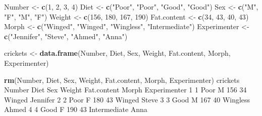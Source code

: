 \documentclass[
]{book}
\newenvironment{Shaded}{\begin{snugshade}}{\end{snugshade}}
\newcommand{\DecValTok}[1]{\textcolor[rgb]{0.00,0.00,0.81}{#1}}
\newcommand{\KeywordTok}[1]{\textcolor[rgb]{0.13,0.29,0.53}{\textbf{#1}}}
\newcommand{\NormalTok}[1]{#1}
\newcommand{\StringTok}[1]{\textcolor[rgb]{0.31,0.60,0.02}{#1}}
\begin{document}
\begin{Shaded}
\begin{Highlighting}[]
\NormalTok{Number <-}\StringTok{ }\KeywordTok{c}\NormalTok{(}\DecValTok{1}\NormalTok{, }\DecValTok{2}\NormalTok{, }\DecValTok{3}\NormalTok{, }\DecValTok{4}\NormalTok{)}
\NormalTok{Diet <-}\StringTok{ }\KeywordTok{c}\NormalTok{(}\StringTok{"Poor"}\NormalTok{, }\StringTok{"Poor"}\NormalTok{, }\StringTok{"Good"}\NormalTok{, }\StringTok{"Good"}\NormalTok{)}
\NormalTok{Sex <-}\StringTok{ }\KeywordTok{c}\NormalTok{(}\StringTok{"M"}\NormalTok{, }\StringTok{"F"}\NormalTok{, }\StringTok{"M"}\NormalTok{, }\StringTok{"F"}\NormalTok{) }
\NormalTok{Weight <-}\StringTok{ }\KeywordTok{c}\NormalTok{(}\DecValTok{156}\NormalTok{, }\DecValTok{180}\NormalTok{, }\DecValTok{167}\NormalTok{, }\DecValTok{190}\NormalTok{) }
\NormalTok{Fat.content <-}\StringTok{ }\KeywordTok{c}\NormalTok{(}\DecValTok{34}\NormalTok{, }\DecValTok{43}\NormalTok{, }\DecValTok{40}\NormalTok{, }\DecValTok{43}\NormalTok{) }
\NormalTok{Morph <-}\StringTok{ }\KeywordTok{c}\NormalTok{(}\StringTok{"Winged"}\NormalTok{, }\StringTok{"Winged"}\NormalTok{, }\StringTok{"Wingless"}\NormalTok{, }\StringTok{"Intermediate"}\NormalTok{)}
\NormalTok{Experimenter <-}\StringTok{ }\KeywordTok{c}\NormalTok{(}\StringTok{"Jennifer"}\NormalTok{, }\StringTok{"Steve"}\NormalTok{, }\StringTok{"Ahmed"}\NormalTok{, }\StringTok{"Anna"}\NormalTok{)}
       
\NormalTok{crickets <-}\StringTok{ }\KeywordTok{data.frame}\NormalTok{(Number, }
\NormalTok{                       Diet, }
\NormalTok{                       Sex, }
\NormalTok{                       Weight, }
\NormalTok{                       Fat.content, }
\NormalTok{                       Morph, }
\NormalTok{                       Experimenter)}

\KeywordTok{rm}\NormalTok{(Number, Diet, Sex, Weight, Fat.content, Morph, Experimenter)}
\NormalTok{crickets}
\NormalTok{  Number Diet Sex Weight Fat.content        Morph Experimenter}
\DecValTok{1}      \DecValTok{1}\NormalTok{ Poor   M    }\DecValTok{156}          \DecValTok{34}\NormalTok{       Winged     Jennifer}
\DecValTok{2}      \DecValTok{2}\NormalTok{ Poor   F    }\DecValTok{180}          \DecValTok{43}\NormalTok{       Winged        Steve}
\DecValTok{3}      \DecValTok{3}\NormalTok{ Good   M    }\DecValTok{167}          \DecValTok{40}\NormalTok{     Wingless        Ahmed}
\DecValTok{4}      \DecValTok{4}\NormalTok{ Good   F    }\DecValTok{190}          \DecValTok{43}\NormalTok{ Intermediate         Anna}
\end{Highlighting}
\end{Shaded}
\end{document}
